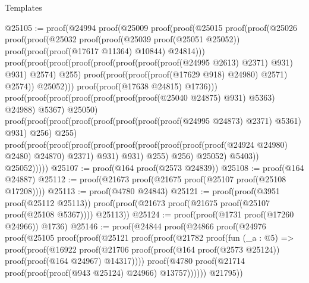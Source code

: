 \begin{lexlean}{Templates}
\begin{coremodule}
@25105 := proof(@24994
      proof(@25009
          proof(proof(@25015
                proof(proof(@25026
                      proof(proof(@25032
                            proof(proof(@25039 proof(@25051 @25052))
                                proof(proof(proof(@17617 @11364) @10844) @24814)))
                          proof(proof(proof(proof(proof(proof(proof(proof(@24995 @2613) @2371) @931)
                                      @931)
                                    @2574)
                                  @255)
                                proof(proof(proof(proof(@17629 @918) @24980) @2571) @2574))
                              @25052)))
                    proof(proof(@17638 @24815) @1736)))
              proof(proof(proof(proof(proof(proof(proof(@25040 @24875) @931) @5363) @24988) @5367)
                    @25050)
                  proof(proof(proof(proof(proof(proof(proof(proof(@24995 @24873) @2371) @5361) @931)
                            @256)
                          @255)
                        proof(proof(proof(proof(proof(proof(proof(proof(proof(proof(@24924 @24980)
                                            @2480)
                                          @24870)
                                        @2371)
                                      @931)
                                    @931)
                                  @255)
                                @256)
                              @25052)
                            @5403))
                      @25052)))))
@25107 := proof(@164 proof(@2573 @24839))
@25108 := proof(@164 @24887)
@25112 := proof(@21673 proof(@21675 proof(@25107 proof(@25108 @17208))))
@25113 := proof(@4780 @24843)
@25121 := proof(proof(@3951 proof(@25112 @25113))
      proof(proof(@21673 proof(@21675 proof(@25107 proof(@25108 @5367)))) @25113))
@25124 := proof(proof(@1731 proof(@17260 @24966)) @1736)
@25146 := proof(@24844
      proof(@24866
          proof(@24976
              proof(@25105
                  proof(proof(@25121
                        proof(proof(@21782
                              proof(fun (_a : @5) =>
                                proof(proof(@16922
                                      proof(@21706
                                          proof(proof(@164 proof(@2573 @25124))
                                              proof(proof(@164 @24967) @14317))))
                                    proof(@4780
                                        proof(@21714
                                            proof(proof(proof(@943 @25124) @24966) @13757))))))
                            @21795))

\end{coremodule}
\end{lexlean}

